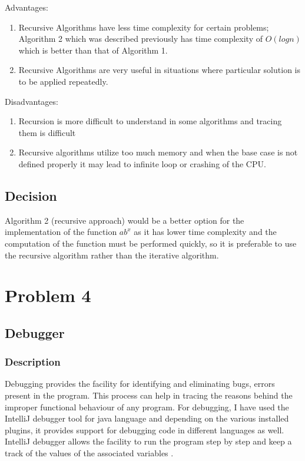 \documentclass[12pt, a4paper]{article}
\begin{document}
Advantages:
\begin{enumerate}
    \item {Recursive Algorithms have less time complexity for certain problems;  Algorithm 2 which was described previously has time complexity of $O(logn)$ which is better than that of Algorithm 1.}
    \item {Recursive Algorithms are very useful in situations where particular solution is to be applied repeatedly.}
    
\end{enumerate}

Disadvantages:
\begin{enumerate}
    \item {Recursion is more difficult to understand in some algorithms and tracing them is difficult}
    \item {Recursive algorithms utilize too much memory and when the base case is not defined properly it may lead to infinite loop or crashing of the CPU.}
    
\end{enumerate}

\subsection*{Decision}
Algorithm 2 (recursive approach) would be a better option for the implementation of the function $ab^x$ as it has lower time complexity and the computation of the function must be performed quickly, so it is preferable to use the recursive algorithm rather than the iterative algorithm.

\section{Problem 4 }
\subsection{Debugger}
\subsubsection{Description}
Debugging provides the facility for identifying and eliminating bugs, errors present in the program. This process can help in tracing the reasons behind the improper functional behaviour of any program. For debugging, I have used the IntelliJ debugger tool for java language and depending on the various installed plugins, it provides support for debugging code in different languages as well. IntelliJ debugger allows the facility to run the program step by step and keep a track of the values of the associated variables \cite{IntelliJ Debugger}.
\end{document}
